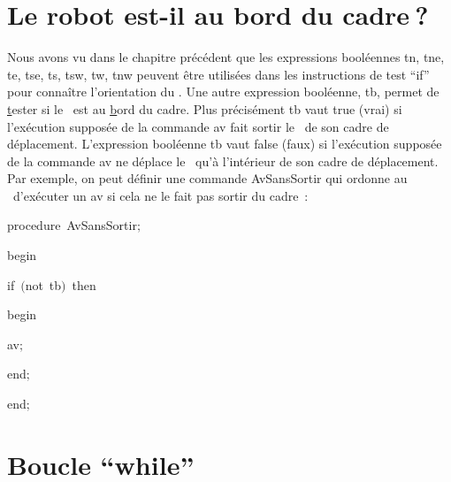 \section{Le robot est-il au bord du cadre$\:$?}
Nous avons vu dans le chapitre précédent que les expressions booléennes {\idt tn}, {\idt tne}, {\idt te}, {\idt tse}, {\idt ts},
 {\idt tsw}, {\idt tw}, {\idt tnw} peuvent être utilisées dans les instructions
 de test ``if'' pour connaître l'orientation du \robot. Une autre  expression booléenne,  
 {\idt tb}, permet de \underline{t}ester si
 le \robot\ est au \underline{b}ord du cadre. Plus précisément {\idt tb} vaut {\idt true} (vrai) 
 si l'exécution supposée de la  commande {\idt av} fait sortir
 le \robot\ de son cadre de déplacement.  L'expression booléenne
 {\idt tb} vaut {\idt false} (faux) si l'exécution supposée 
 de la  commande {\idt av} ne déplace le \robot\ qu'à l'intérieur de son cadre de déplacement.
Par exemple, on peut
 définir une commande {\idt AvSansSortir} qui ordonne au \robot\ d'exécuter un {\idt av} si cela ne le
 fait pas sortir du cadre~:
 
{
\parindent {}
\medskip

\pagebreak[3] 
\vspace{\neglskip}\mbox{\blc  \blk\idt  \mcl procedure\idt \ AvSansSortir$;$}\par 
\vspace{\neglskip}\mbox{\blc  \blk\idt  \mcl begin\idt }\par 
\pagebreak[3] 
\vspace{\neglskip}\mbox{\blc  \blk\blk\idt  \mcl if\idt \ $($\mcl not\idt \ tb$)$\ \mcl then\idt }\par 
\vspace{\neglskip}\mbox{\blc  \blk\blk\blk\idt  \mcl begin\idt }\par 
\vspace{\neglskip}\mbox{\blc  \blk\blk\blk\blk\idt  av$;$\ }\par 
\vspace{\neglskip}\mbox{\blc  \blk\blk\blk\idt  \mcl end\idt $;$}\par 
\vspace{\neglskip}\mbox{\blc  \blk\idt  \mcl end\idt $;$}\par 

\medskip }

\section{Boucle ``while''}

